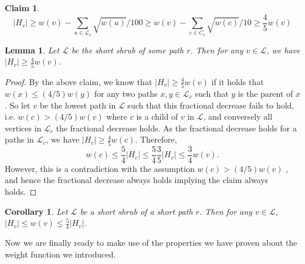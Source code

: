 \documentclass[11pt]{article}
\newtheorem{lemma}[theorem]{Lemma}
\newtheorem{claim}[theorem]{Claim}
\newtheorem{corollary}[theorem]{Corollary}
\theoremstyle{definition}
\newcommand{\Lem}[1]{\hyperref[lem:#1]{Lemma~\ref*{lem:#1}}} %
\begin{document}
{\begin{claim}
\[
|H_v|\geq w(v)-\sum_{u\in \mathcal{L}_v} \sqrt{w(u)}/100 \geq w(v)- \sum_{c\in C_v} \sqrt{w(c)}/10 \geq \frac{4}{5} w(v)
\]
\end{claim}



\begin{lemma}
Let $\mathcal{L}$ be the short shrub of some path $r$.  
Then for any $v\in \mathcal{L}$, we have $|H_v|\geq \frac{4}{5} w(v)$.
\end{lemma}
% 
% 
%
\begin{proof}
By the above claim, we know that $|H_v|\geq \frac{4}{5} w(v)$ if it holds that 
$w(x)\leq (4/5) w(y)$ for any two paths $x,y\in \mathcal{L}_v$ such that $y$ is the parent of $x$.
So let $v$ be the lowest path in $\mathcal{L}$ such that this fractional decrease fails to hold, i.e. $w(c)> (4/5) w(v)$ 
where $c$ is a child of $v$ in $\mathcal{L}$, and conversely all vertices in $\mathcal{L}_c$ 
the fractional decrease holds.  As the fractional decrease holds for a paths in $\mathcal{L}_c$, 
we have $|H_c|\geq \frac{4}{5} w(c)$.  Therefore,
\[
w(c) \leq \frac{5}{4}|H_c| \leq \frac{5}{4} \frac{3}{5} |H_v| \leq \frac{3}{4} w(v).
\]
However, this is a contradiction with the assumption $w(c)> (4/5) w(v)$ , and hence the 
fractional decrease always holds implying the claim always holds.
\end{proof}

\begin{corollary}
\label{cor:equivalent}
 Let $\mathcal{L}$ be a short shrub of a short path $r$.  Then for any $v\in \mathcal{L}$, $|H_v| \leq w(v) \leq \frac{5}{4} |H_v|$.
\end{corollary}

Now we are finally ready to make use of the properties we have proven about the weight function we introduced.

}
\end{document}
